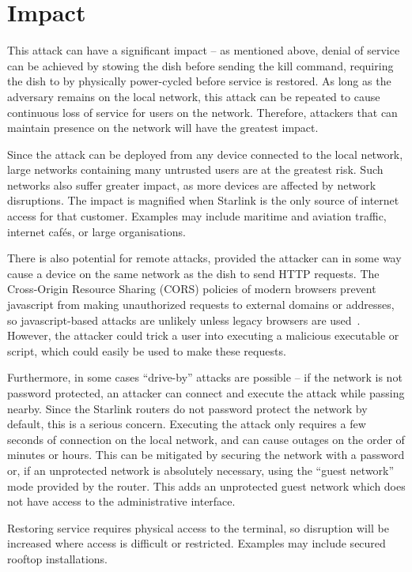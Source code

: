 \section{Impact}\label{sec:impact}

This attack can have a significant impact -- as mentioned above, denial of service can be achieved by stowing the dish before sending the kill command, requiring the dish to by physically power-cycled before service is restored.
As long as the adversary remains on the local network, this attack can be repeated to cause continuous loss of service for users on the network.
Therefore, attackers that can maintain presence on the network will have the greatest impact.

Since the attack can be deployed from any device connected to the local network, large networks containing many untrusted users are at the greatest risk.
Such networks also suffer greater impact, as more devices are affected by network disruptions.
The impact is magnified when Starlink is the only source of internet access for that customer.
Examples may include maritime and aviation traffic, internet cafés, or large organisations.

There is also potential for remote attacks, provided the attacker can in some way cause a device on the same network as the dish to send HTTP requests.
The Cross-Origin Resource Sharing (CORS) policies of modern browsers prevent javascript from making unauthorized requests to external domains or addresses, so javascript-based attacks are unlikely unless legacy browsers are used~\cite{cors}.
However, the attacker could trick a user into executing a malicious executable or script, which could easily be used to make these requests.

Furthermore, in some cases ``drive-by'' attacks are possible -- if the network is not password protected, an attacker can connect and execute the attack while passing nearby.
Since the Starlink routers do not password protect the network by default, this is a serious concern.
Executing the attack only requires a few seconds of connection on the local network, and can cause outages on the order of minutes or hours.
This can be mitigated by securing the network with a password or, if an unprotected network is absolutely necessary, using the ``guest network'' mode provided by the router.
This adds an unprotected guest network which does not have access to the administrative interface.

Restoring service requires physical access to the terminal, so disruption will be increased where access is difficult or restricted.
Examples may include secured rooftop installations.



